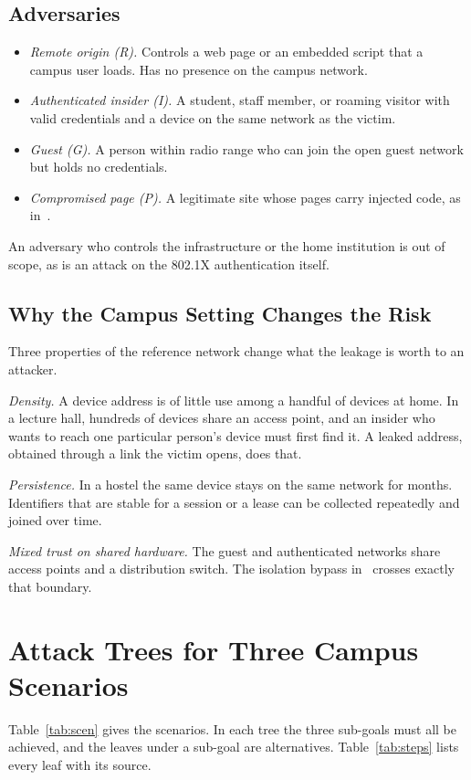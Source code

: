 \documentclass[conference]{IEEEtran}
\begin{document}
\subsection{Adversaries}
\begin{itemize}
\item \textit{Remote origin (R).} Controls a web page or an embedded script that a campus user loads. Has no presence on the campus network.
\item \textit{Authenticated insider (I).} A student, staff member, or roaming visitor with valid credentials and a device on the same network as the victim.
\item \textit{Guest (G).} A person within radio range who can join the open guest network but holds no credentials.
\item \textit{Compromised page (P).} A legitimate site whose pages carry injected code, as in~\cite{sansec2026}.
\end{itemize}
An adversary who controls the infrastructure or the home institution is out of scope, as is an attack on the 802.1X authentication itself.

\subsection{Why the Campus Setting Changes the Risk}
Three properties of the reference network change what the leakage is worth to an attacker.

\textit{Density.} A device address is of little use among a handful of devices at home. In a lecture hall, hundreds of devices share an access point, and an insider who wants to reach one particular person's device must first find it. A leaked address, obtained through a link the victim opens, does that.

\textit{Persistence.} In a hostel the same device stays on the same network for months. Identifiers that are stable for a session or a lease can be collected repeatedly and joined over time.

\textit{Mixed trust on shared hardware.} The guest and authenticated networks share access points and a distribution switch. The isolation bypass in~\cite{airsnitch2026} crosses exactly that boundary.

\section{Attack Trees for Three Campus Scenarios}
\label{sec:trees}
Table~\ref{tab:scen} gives the scenarios. In each tree the three sub-goals must all be achieved, and the leaves under a sub-goal are alternatives. Table~\ref{tab:steps} lists every leaf with its source.
\end{document}
